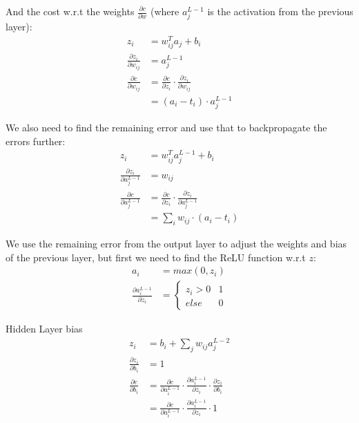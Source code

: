 And the cost w.r.t the weights \(\frac{\partial c}{\partial w}\) (where \(
a_{j}^{L-1} \) is the activation from the previous layer):
\begin{equation}
    \begin{aligned}
        z_{i} &= w_{ij}^{T}a_{j} + b_{i}\\
        \frac{\partial z_{i}}{\partial w_{ij}} &= a_{j}^{L-1}\\[2em]
        \frac{\partial c}{\partial w_{ij}} &= \frac{\partial c}{\partial z_{i}} \cdot \frac{\partial z_{i}}{\partial w_{ij}}\\
        &= (a_{i} - t_{i}) \cdot a_{j}^{L-1}
    \end{aligned}
\end{equation}

We also need to find the remaining error and use that to backpropagate the errors further:
\begin{equation}
    \begin{aligned}
        z_{i} &= w_{ij}^{T}a_{j}^{L-1} + b_{i}\\
        \frac{\partial z_{i}}{\partial a_{j}^{L-1}} &= w_{ij}\\[2em]
        \frac{\partial c}{\partial a_{j}^{L-1}} &= \frac{\partial c}{\partial z_{i}} \cdot \frac{\partial z_{i}}{\partial a_{j}^{L-1}}\\
        &= \sum_{i} w_{ij} \cdot (a_{i} - t_{i}) 
    \end{aligned}
\end{equation}

We use the remaining error from the output layer to adjust the weights and bias
of the previous layer, but first we need to find the ReLU function w.r.t \(z\):
\begin{equation}
    \begin{aligned}
        a_{i} &= max(0,z_{i})\\[2em]
        \frac{\partial a_{i}^{L-1}}{\partial z_{i}} &= 
        \begin{cases}
            z_{i} > 0 & 1 \\
            else & 0
        \end{cases}
    \end{aligned}
\end{equation}

Hidden Layer bias
\begin{equation}
    \begin{aligned}
        z_{i} &= b_{i} + \sum_{j} w_{ij}a_{j}^{L-2} \\
        \frac{\partial z_{i}}{\partial b_{i}} &= 1\\[2em]
        \frac{\partial c}{\partial b_{i}} &= \frac{\partial c}{\partial a_{i}^{L-1}} \cdot \frac{\partial a_{i}^{L-1}}{\partial z_{i}} \cdot  \frac{\partial z_{i}}{\partial b_{i}} \\
                                          &= \frac{\partial c}{\partial a_{i}^{L-1}} \cdot \frac{\partial a_{i}^{L-1}}{\partial z_{i}} \cdot  1
    \end{aligned}
\end{equation}

